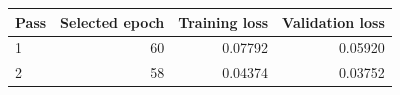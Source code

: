 \begin{tabular}{lrrr}
\toprule
Pass & Selected epoch & Training loss & Validation loss \\
\midrule
1 & 60 & 0.07792 & 0.05920 \\
2 & 58 & 0.04374 & 0.03752 \\
\bottomrule
\end{tabular}
